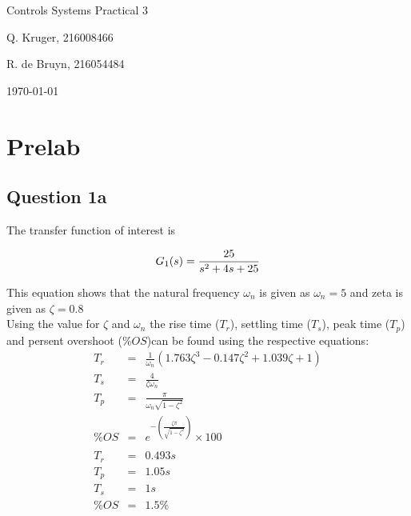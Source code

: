 \documentclass[12pt, a4paper]{article}
\begin{document}
		\begin{titlepage}
			\centering
			{\LARGE Controls Systems Practical 3 \par}
			\vspace*{1.5cm}
			{\large Q. Kruger, 216008466 \par}
			{\large R. de Bruyn, 216054484 \par}
			\vspace*{1.2cm}
			{\large \today}
			\vspace*{\fill}
			\vspace*{\fill}
		\end{titlepage}

		\tableofcontents
		\listoffigures
		\listoftables
		\newpage

	\section{Prelab} %
	\label{sec:prelab}
		\subsection{Question 1a} %
		\label{sub:question_1}
		The transfer function of interest is 

		\begin{equation}
			\label{eqn:G_1}
			G_1(s) =\frac{25}{s^2 +4s+25} \\
		\end{equation}
				
	
		This equation shows that the natural frequency $\omega_n$ is given as $\omega_n = 5$ and zeta is given as $\zeta = 0.8$\\ 

		Using the value for $\zeta$ and $\omega_n$ the rise time ($T_r$), settling time ($T_s$), peak time ($T_p$) and persent overshoot ($\%OS$)can be found using the respective equations:
		\[
			\begin{array}{rcl}

				T_r &=& \frac{1}{\omega_n}(1.763\zeta^3-0.147\zeta^2+1.039\zeta+1)\\
				T_s &=& \frac{4}{\zeta\omega_n}\\
				T_p &=& \frac{\pi}{\omega_n\sqrt{1-\zeta^2}}\\
				\%OS &=& e^{-(\frac{\zeta\pi}{\sqrt{1-\zeta^2}})} \times 100\\
				\\
				T_r &=& 0.493 s \\
				T_p &=& 1.05 s\\
				T_s &=& 1 s\\
				\%OS &=& 1.5 \%\\
			\end{array}
		\]
\end{document}
